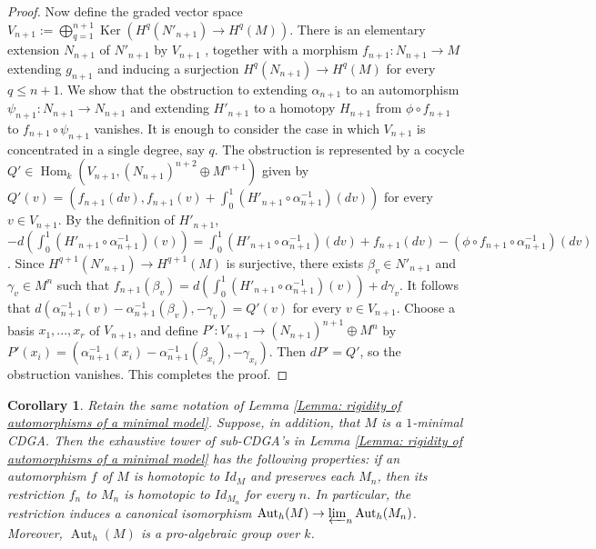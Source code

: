 \documentclass[11pt]{amsart}
\newtheorem{corollary}[theorem]{Corollary}
\theoremstyle{definition}
\numberwithin{equation}{section}
\numberwithin{equation}{section}
\DeclareMathOperator{\Aut}{Aut}
\DeclareMathOperator{\homo}{Hom}
\DeclareMathOperator{\Ker}{Ker}
\begin{document}
\begin{proof}
Now define the graded vector space $V_{n+1}:=\bigoplus_{q=1}^{n+1}\Ker(H^q(N'_{n+1})\rightarrow H^q(M))$. There is an elementary extension $N_{n+1}$ of $N'_{n+1}$ by $V_{n+1}$ , together with a morphism $f_{n+1}:N_{n+1}\rightarrow M$ extending $g_{n+1}$ and inducing a surjection $H^{q}(N_{n+1})\rightarrow H^{q}(M)$ for every $q\leq n+1$. We show that the obstruction to extending $\alpha_{n+1}$ to an automorphism $\psi_{n+1}:N_{n+1}\rightarrow N_{n+1}$ and extending $H'_{n+1}$ to a homotopy $H_{n+1}$ from $\phi\circ f_{n+1}$ to  $f_{n+1}\circ \psi_{n+1}$ vanishes. It is enough to consider the case in which $V_{n+1}$ is concentrated in a single degree, say $q$. 
The obstruction is represented by a cocycle $Q'\in \homo_k(V_{n+1},(N_{n+1})^{n+2}\oplus M^{n+1})$ given by $Q'(v)=(f_{n+1}(dv),f_{n+1}(v)+\int_{0}^1( H'_{n+1}\circ \alpha_{n+1}^{-1})(dv))$ for every $v\in V_{n+1}$. By the definition of $H'_{n+1}$, $-d(\int_{0}^1(H'_{n+1}\circ \alpha^{-1}_{n+1})(v))=\int_{0}^1(H'_{n+1}\circ \alpha^{-1}_{n+1})(dv)+f_{n+1}(dv)-(\phi\circ f_{n+1}\circ \alpha_{n+1}^{-1})(dv)$. Since $H^{q+1}(N'_{n+1})\rightarrow H^{q+1}(M)$ is surjective, there exists $\beta_v\in N'_{n+1}$ and $\gamma_v\in M^{n}$ such that $f_{n+1}(\beta_v)=d(\int_{0}^1(H'_{n+1}\circ \alpha^{-1}_{n+1})(v))+d\gamma_v$. It follows that $d(\alpha^{-1}_{n+1}(v)-\alpha^{-1}_{n+1}(\beta_v),-\gamma_v)=Q'(v)$ for every $v\in V_{n+1}$. Choose a basis $x_1,...,x_r$ of $V_{n+1}$, and define $P':V_{n+1}\rightarrow (N_{n+1})^{n+1}\oplus M^{n}$ by $P'(x_i)=(\alpha^{-1}_{n+1}(x_i)-\alpha_{n+1}^{-1}(\beta_{x_i}),-\gamma_{x_i})$. Then $dP'=Q'$, so the obstruction vanishes. This completes the proof.
\end{proof}

\begin{corollary}\label{Cor: automorphism of 1-minimal CDGA to automorphisms of its filtration}
Retain the same notation of Lemma \ref{Lemma: rigidity of automorphisms of a minimal model}. Suppose, in addition, that $M$ is a $1$-minimal CDGA. Then the exhaustive tower of sub-CDGA's in Lemma \ref{Lemma: rigidity of automorphisms of a minimal model} has the following properties: if an automorphism $f$ of $M$ is homotopic to $Id_{M}$ and preserves each $M_n$, then its restriction $f_n$ to $M_n$ is homotopic to $Id_{M_n}$ for every $n$. In particular, the restriction induces a canonical isomorphism $\Aut_h(M)\rightarrow \varprojlim_n\Aut_h(M_n)$. Moreover, $\Aut_h(M)$ is a pro-algebraic group over $k$.
\end{corollary}
\end{document}
